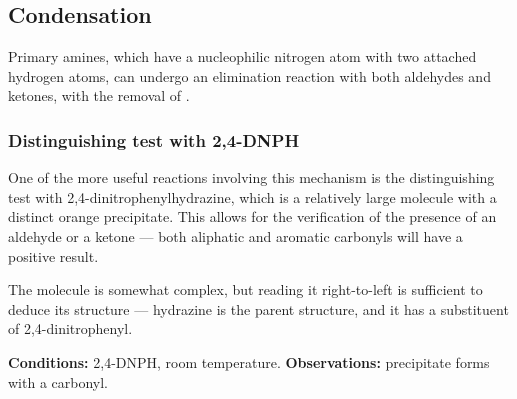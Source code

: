 

		\subsection{Condensation}

			Primary amines, which have a nucleophilic nitrogen atom with two attached hydrogen atoms, can undergo an elimination
			reaction with both aldehydes and ketones, with the removal of .


			\subsubsection{Distinguishing test with 2,4-DNPH}

				One of the more useful reactions involving this mechanism is the distinguishing test with 2,4-dinitrophenylhydrazine, which
				is a relatively large molecule with a distinct orange precipitate. This allows for the verification of the presence of
				an aldehyde or a ketone --- both aliphatic and aromatic carbonyls will have a positive result.

				The molecule is somewhat complex, but reading it right-to-left is sufficient to deduce its structure --- hydrazine is the parent
				structure, and it has a substituent of 2,4-dinitrophenyl.

				\vspace{1.5em}
				\vbox{\textbf{Conditions:}	\tabto{35mm}2,4-DNPH, room temperature.}
				\vbox{\textbf{Observations:} precipitate forms with a carbonyl.}


